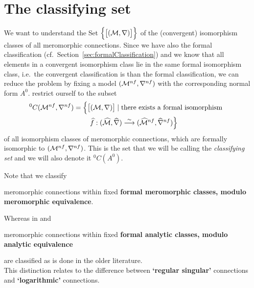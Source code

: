 \section{The classifying set}\label{sec:classifyingSet}
We want to understand the Set
$\Big\{\big[(\mathcal{M},\nabla)\big]\Big\}$ of the (convergent)
isomorphism classes of all meromorphic connections. Since we have also the
formal classification (cf.\ Section~\ref{sec:formalClassification}) and we
know that all elements in a convergent isomorphism class lie in the same
formal isomorphism class, i.e.\ the convergent classification is
 than the formal classification, we can reduce the problem by
fixing a model $(\mathcal{M}^{nf},\nabla^{nf})$ with the corresponding normal form
$A^0$.
 restrict ourself to the subset
\begin{multline*}
  {}^0C(\mathcal{M}^{nf},\nabla^{nf})=\Big\{
    \big[(\mathcal{M},\nabla)\big]
    \mid \text{there exists a formal isomorphism }
  \\\qquad\widehat f:(\widehat{\mathcal{M}},\widehat\nabla)
      \overset{\sim}\longrightarrow
      (\widehat{\mathcal{M}}^{nf},\widehat\nabla^{nf})
  \Big\}
\end{multline*}
of all isomorphism classes of meromorphic connections, which are formally
isomorphic to $(\mathcal{M}^{nf},\nabla^{nf})$. This is the set that we will be
calling the \emph{classifying set} and we will also denote it ${}^0C(A^0)$.
\begin{rem}
  Note that we classify
  \begin{einr}
    meromorphic connections within fixed \textbf{formal meromorphic classes,
    modulo meromorphic equivalence}.
  \end{einr}
  Whereas in \cite{boalch} and \cite{thboalch}
  \begin{einr}
    meromorphic connections within fixed \textbf{formal analytic classes,
    modulo analytic equivalence}
  \end{einr}
  are classified as is done in the older literature. 
  \\This distinction relates to the difference between \textbf{‘regular
  singular’} connections and \textbf{‘logarithmic’} connections.
\end{rem}
